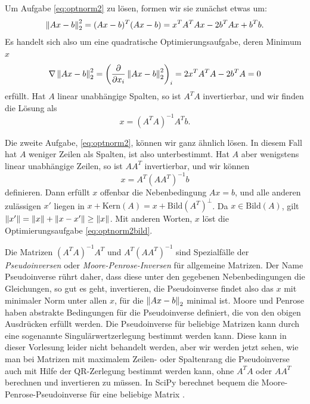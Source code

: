 Um Aufgabe \eqref{eq:optnorm2} zu lösen, formen wir sie zunächst etwas um:
\begin{equation}
  \left\lVert{Ax - b}\right\rVert^2_2 = (Ax - b)^T(Ax - b)
  = x^TA^TAx - 2b^TAx + b^Tb.
\end{equation}
Es handelt sich also um eine quadratische Optimierungsaufgabe, deren
Minimum $x$
\begin{equation}
  \nabla \left\lVert{Ax - b}\right\rVert^2_2 = \left(\frac{\partial}{\partial x_i} \left\lVert{Ax -
    b}\right\rVert^2_2\right)_i = 2x^TA^TA - 2b^TA = 0
\end{equation}
erfüllt. Hat $A$ linear unabhängige Spalten, so ist $A^TA$ invertierbar,
und wir finden die Lösung als
\begin{equation}
  x = (A^TA)^{-1}A^Tb.
\end{equation}

Die zweite Aufgabe, \eqref{eq:optnorm2}, können wir ganz ähnlich
lösen. In diesem Fall hat $A$ weniger Zeilen als Spalten, ist also
unterbestimmt. Hat $A$ aber wenigstens linear unabhängige Zeilen, so
ist $AA^T$ invertierbar, und wir können
\begin{equation}
  x = A^T(AA^T)^{-1}b
\end{equation}
definieren. Dann erfüllt $x$ offenbar die Nebenbedingung $Ax=b$, und
alle anderen zulässigen $x'$ liegen in $x + \text{Kern}(A) = x +
\text{Bild}(A^T)^\perp$. Da $x\in\text{Bild}(A)$, gilt
$\left\lVert{x'}\right\rVert=\left\lVert{x}\right\rVert + \left\lVert{x-x'}\right\rVert\ge \left\lVert{x}\right\rVert$. Mit anderen Worten,
$x$ löst die Optimierungsaufgabe \eqref{eq:optnorm2bild}.

Die Matrizen $(A^TA)^{-1}A^T$ und $A^T(AA^T)^{-1}$ sind Spezialfälle
der \emph{Pseudoinversen} oder \emph{Moore-Penrose-Inversen} für
allgemeine Matrizen. Der Name Pseudoinverse rührt daher, dass diese
unter den gegebenen Nebenbedingungen die Gleichungen, so gut es geht,
invertieren, die Pseudoinverse findet also das $x$ mit minimaler Norm
unter allen $x$, für die $\left\lVert{Ax-b}\right\rVert_2$ minimal ist.  Moore und
Penrose haben abstrakte Bedingungen für die Pseudoinverse definiert,
die von den obigen Ausdrücken erfüllt werden. Die Pseudoinverse für
beliebige Matrizen kann durch eine sogenannte Singulärwertzerlegung
bestimmt werden kann. Diese kann in dieser Vorlesung leider nicht
behandelt werden, aber wir werden jetzt sehen, wie man bei Matrizen
mit maximalem Zeilen- oder Spaltenrang die Pseudoinverse auch mit
Hilfe der QR-Zerlegung bestimmt werden kann, ohne $A^TA$ oder $AA^T$
berechnen und invertieren zu müssen. In SciPy berechnet
 bequem die Moore-Penrose-Pseudoinverse
für eine beliebige Matrix .

